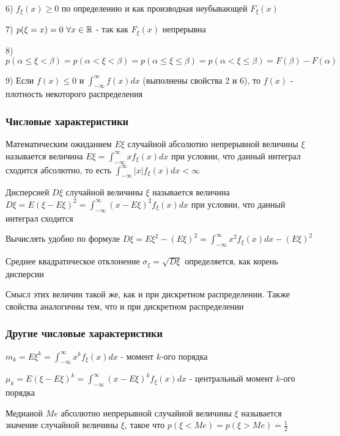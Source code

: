 \documentclass[12pt]{article}
\begin{document}
    6) $f_\xi(x) \geq 0$ по определению и как производная неубывающей $F_\xi(x)$

    7) $p(\xi = x) = 0 \ \forall x \in \mathbb{R}$ - так как $F_\xi(x)$ непрерывна

    8) $p(\alpha \leq \xi < \beta) = p(\alpha < \xi < \beta) = p(\alpha \leq \xi \leq \beta) = p(\alpha < \xi \leq \beta) = F(\beta) - F(\alpha)$

    9) \Ths Если $f(x) \leq 0$ и $\int_{-\infty}^{\infty} f(x)dx$ (выполнены свойства 2 и 6), то $f(x)$ - плотность некоторого распределения

    \hypertarget{attributesofcontinuousrandomvariable}{}

    \subsubsection{Числовые характеристики}

    \Def Математическим ожиданием $E\xi$ случайной абсолютно непрерывной величины $\xi$ называется величина $E\xi = \int_{-\infty}^{\infty} xf_\xi(x) dx$ 
    при условии, что данный интеграл сходится абсолютно, то есть $\int_{-\infty}^\infty |x|f_\xi(x)dx < \infty$

    \Def Дисперсией $D\xi$ случайной величины $\xi$ называется величина $D\xi = E(\xi - E\xi)^2 = \int_{-\infty}^\infty (x - E\xi)^2 f_\xi(x) dx$ при условии,
    что данный интеграл сходится

    \Notas Вычислять удобно по формуле $D\xi = E\xi^2 - (E\xi)^2 = \int_{-\infty}^\infty x^2 f_\xi(x)dx - (E\xi)^2$

    \Def Среднее квадратическое отклонение $\sigma_\xi = \sqrt{D\xi}$ определяется, как корень дисперсии

    Смысл этих величин такой же, как и при дискретном распределении. Также свойства аналогичны тем, что и при дискретном распределении

    \subsubsection{Другие числовые характеристики}

    $m_k = E\xi^k = \int_{-\infty}^\infty x^k f_\xi(x)dx$ - момент $k$-ого порядка

    $\mu_k = E(\xi - E\xi)^k = \int_{-\infty}^\infty (x - E\xi)^k f_\xi(x)dx$ - центральный момент $k$-ого порядка

    \Def Медианой $Me$ абсолютно непрерывной случайной величины $\xi$ называется значение случайной величины $\xi$, такое что $p(\xi < Me) = p(\xi > Me) = \frac{1}{2}$
    
\end{document}
